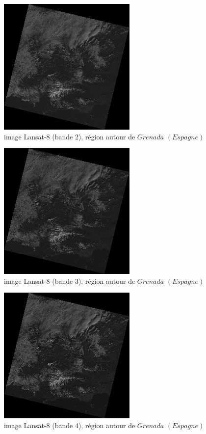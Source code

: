 \documentclass{book}
\begin{document}
\begin{figure}[H]
\begin{center}
\includegraphics[scale=0.8]{LC82000342015021LGN00_B2r.jpg}
\end{center}
\caption{image Lansat-8 (bande 2), région autour de $Grenada$ $(Espagne)$}
\label{band2}
\end{figure}

\begin{figure}[H]
\begin{center}
\includegraphics[scale=0.8]{LC82000342015021LGN00_B3r.jpg}
\end{center}
\caption{image Lansat-8 (bande 3), région autour de $Grenada$ $(Espagne)$}
\label{band3}
\end{figure}

\begin{figure}[H]
\begin{center}
\includegraphics[scale=0.8]{LC82000342015021LGN00_B4r.jpg}
\end{center}
\caption{image Lansat-8 (bande 4), région autour de $Grenada$ $(Espagne)$}
\label{band4}
\end{figure}
\end{document}
